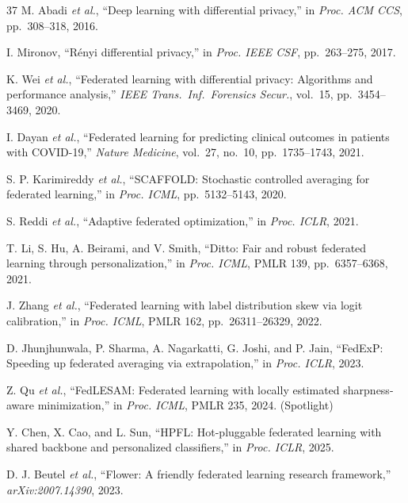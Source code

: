 \documentclass[conference]{IEEEtran}
\begin{document}
\begin{thebibliography}{37}
M. Abadi \textit{et al.}, ``Deep learning with differential privacy,'' in \textit{Proc. ACM CCS}, pp.~308--318, 2016.

I. Mironov, ``R\'enyi differential privacy,'' in \textit{Proc. IEEE CSF}, pp.~263--275, 2017.

K. Wei \textit{et al.}, ``Federated learning with differential privacy: Algorithms and performance analysis,'' \textit{IEEE Trans.~Inf.~Forensics Secur.}, vol.~15, pp.~3454--3469, 2020.

I. Dayan \textit{et al.}, ``Federated learning for predicting clinical outcomes in patients with COVID-19,'' \textit{Nature Medicine}, vol.~27, no.~10, pp.~1735--1743, 2021.

S. P. Karimireddy \textit{et al.}, ``SCAFFOLD: Stochastic controlled averaging for federated learning,'' in \textit{Proc. ICML}, pp.~5132--5143, 2020.

S. Reddi \textit{et al.}, ``Adaptive federated optimization,'' in \textit{Proc. ICLR}, 2021.

T. Li, S. Hu, A. Beirami, and V. Smith, ``Ditto: Fair and robust federated learning through personalization,'' in \textit{Proc. ICML}, PMLR 139, pp.~6357--6368, 2021.

J. Zhang \textit{et al.}, ``Federated learning with label distribution skew via logit calibration,'' in \textit{Proc. ICML}, PMLR 162, pp.~26311--26329, 2022.

D. Jhunjhunwala, P. Sharma, A. Nagarkatti, G. Joshi, and P. Jain, ``FedExP: Speeding up federated averaging via extrapolation,'' in \textit{Proc. ICLR}, 2023.

Z. Qu \textit{et al.}, ``FedLESAM: Federated learning with locally estimated sharpness-aware minimization,'' in \textit{Proc. ICML}, PMLR 235, 2024. (Spotlight)

Y. Chen, X. Cao, and L. Sun, ``HPFL: Hot-pluggable federated learning with shared backbone and personalized classifiers,'' in \textit{Proc. ICLR}, 2025.

D. J. Beutel \textit{et al.}, ``Flower: A friendly federated learning research framework,'' \textit{arXiv:2007.14390}, 2023.


\end{thebibliography}
\end{document}
